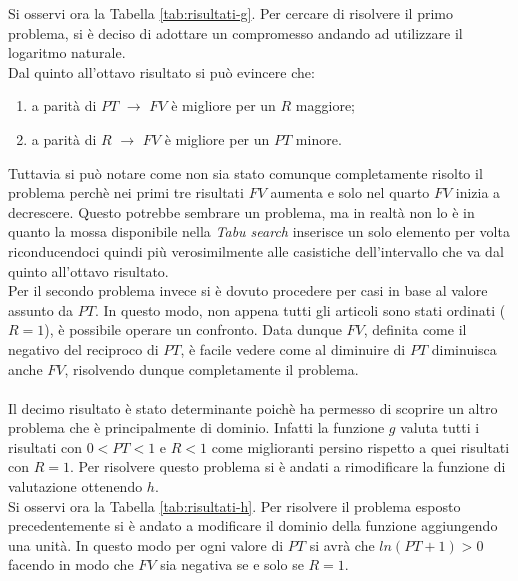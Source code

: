 \noindent Si osservi ora la Tabella \ref{tab:risultati-g}.
Per cercare di risolvere il primo problema, si è deciso di
adottare un compromesso andando ad utilizzare il logaritmo naturale.\\
Dal quinto all'ottavo risultato si può evincere che:
\begin{enumerate}
    \item a parità di $PT$ $\rightarrow$ $FV$ è migliore per
    un $R$ maggiore;
    \item a parità di $R$ $\rightarrow$ $FV$ è migliore per
    un $PT$ minore.
\end{enumerate}
Tuttavia si può notare come non sia stato comunque completamente
risolto il problema perchè nei primi tre risultati
$FV$ aumenta e solo nel quarto $FV$ inizia a decrescere.
Questo potrebbe sembrare un problema, ma in realtà non lo è in
quanto la mossa disponibile nella \textit{Tabu search} inserisce
un solo elemento per volta riconducendoci quindi
più verosimilmente alle casistiche dell'intervallo che va dal quinto all'ottavo risultato.\\

\noindent Per il secondo problema invece si è dovuto procedere per casi in
base al valore assunto da $PT$. In questo modo, non appena
tutti gli articoli sono stati ordinati ($R=1$), è possibile operare
un confronto.
Data dunque $FV$, definita come il negativo del reciproco di $PT$,
è facile vedere come al diminuire di $PT$ diminuisca anche $FV$,
risolvendo dunque completamente il problema.\\\\

\noindent Il decimo risultato è stato determinante poichè ha permesso di
scoprire un altro problema che è principalmente di dominio.
Infatti la funzione $g$ valuta tutti i risultati con $0 < PT < 1$
e $R<1$ come miglioranti persino rispetto a quei
risultati con $R=1$. Per risolvere questo problema si è andati
a rimodificare la funzione di valutazione ottenendo $h$.\\

\noindent Si osservi ora la Tabella \ref{tab:risultati-h}.
Per risolvere il problema esposto precedentemente si è andato
a modificare il dominio della funzione aggiungendo una unità.
In questo modo per ogni valore di $PT$ si avrà che
$ln(PT+1)>0$ facendo in modo che $FV$ sia negativa se e solo se
$R=1$.

